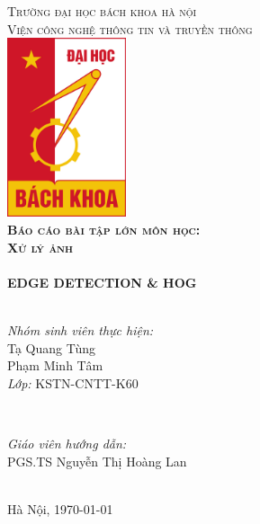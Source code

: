 \documentclass[../report.tex]{subfiles}
\begin{document}
\begin{titlepage}

\center
 
\textsc{\Huge Trường đại học bách khoa hà nội}\\[3mm] %
\textsc{\LARGE Viện công nghệ thông tin và truyền thông}\\[1cm] %
\includegraphics[width=3.5cm]{figures/hust.jpg}\\[1cm] %
 
\textsc{\LARGE\bfseries Báo cáo bài tập lớn môn học:} \\[0.2cm]
\textsc{\huge\bfseries Xử lý ảnh}\\[1cm] %

\HRule \\[5mm]
{\Huge\bfseries EDGE DETECTION \& HOG}\\[2mm] %
\HRule \\[1.5cm]

\begin{minipage}{0.4\textwidth}
\begin{flushleft} \large
\emph{Nhóm sinh viên thực hiện:}\\
Tạ Quang Tùng \\ 
Phạm Minh Tâm \\
\emph{Lớp:} KSTN-CNTT-K60
\end{flushleft}
\end{minipage}
~
\begin{minipage}{0.4\textwidth}
\begin{flushright} \large
\emph{Giáo viên hướng dẫn:} \\
PGS.TS Nguyễn Thị Hoàng Lan
\end{flushright}
\end{minipage}\\[5cm]

{\large Hà Nội, \today}\\[1cm] %

\vfill %

\end{titlepage}
\end{document}
